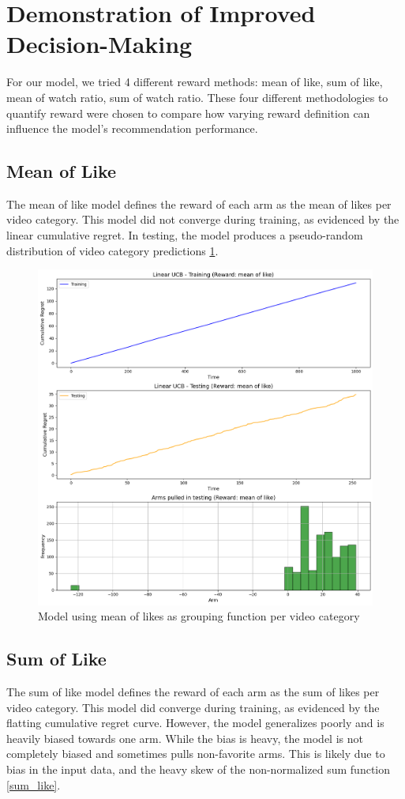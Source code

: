 \section{Demonstration of Improved Decision-Making}

For our model, we tried 4 different reward methods: mean of like, sum of like, mean of watch ratio, sum of watch ratio. These four different methodologies to quantify reward were chosen to compare how varying reward definition can influence the model's recommendation performance. 

\subsection{Mean of Like}


The mean of like model defines the reward of each arm as the mean of likes per video category. This model did not converge during training, as evidenced by the linear cumulative regret. In testing, the model produces a pseudo-random distribution of video category predictions \ref{mean_like}.

\begin{figure}[H]
    \centering
    \includegraphics[width=0.5\linewidth]{summary_report/images/mean_like.png}
    \caption{Model using mean of likes as grouping function per video category}
    \label{mean_like}
\end{figure}

\subsection{Sum of Like}

The sum of like model defines the reward of each arm as the sum of likes per video category. This model did converge during training, as evidenced by the flatting cumulative regret curve. However, the model generalizes poorly and is heavily biased towards one arm. While the bias is heavy, the model is not completely biased and sometimes pulls non-favorite arms. This is likely due to bias in the input data, and the heavy skew of the non-normalized sum function \ref{sum_like}.

